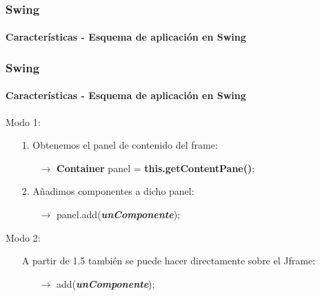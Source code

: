 \documentclass{beamer}
\begin{document}
    \begin{frame}
		\frametitle{Swing}
		\framesubtitle{Caracter\'isticas - Esquema de aplicaci\'on en Swing}

    		\begin{center}
		\end{center}
	\end{frame}

	\begin{frame}
		\frametitle{Swing}
		\framesubtitle{Caracter\'isticas - Esquema de aplicaci\'on en Swing}

		Modo 1:
		\begin{itemize}
		    \item[\checkmark] 1. Obtenemos el panel de contenido del frame:
		    \begin{itemize}
        		    \item[$\rightarrow$] \textbf{Container} panel = \textbf{this.getContentPane()};
        		\end{itemize}
		    \item[\checkmark] 2. A\~nadimos componentes a dicho panel:
		    \begin{itemize}
        		    \item[$\rightarrow$] panel.add(\emph{\textbf{unComponente}});
        		\end{itemize}
		\end{itemize}

		Modo 2:
		\begin{itemize}
		    \item[\checkmark] A partir de 1.5 tambi\'en se puede hacer directamente sobre el Jframe:
		    \begin{itemize}
        		    \item[$\rightarrow$] add(\emph{\textbf{unComponente}});
        		\end{itemize}
		\end{itemize}
	\end{frame}
\end{document}
